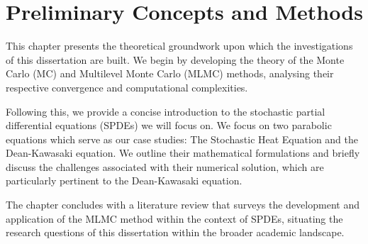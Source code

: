 \chapter{Preliminary Concepts and Methods}\label{chap:preliminary}

This chapter presents the theoretical groundwork upon which the
investigations of this dissertation are built. We begin by developing the theory 
of the Monte Carlo (MC) and Multilevel Monte Carlo (MLMC) methods, analysing their 
respective convergence and computational complexities. 

Following this, we provide a concise introduction to the stochastic partial 
differential equations (SPDEs) we will focus on. We focus on two parabolic 
equations which serve as our case studies: The Stochastic Heat Equation 
and the Dean-Kawasaki equation. We outline their mathematical formulations and briefly 
discuss the challenges associated with their numerical solution, which are particularly 
pertinent to the Dean-Kawasaki equation.

The chapter concludes with a literature review that surveys the development and application 
of the MLMC method within the context of SPDEs, situating the research questions of this 
dissertation within the broader academic landscape.




